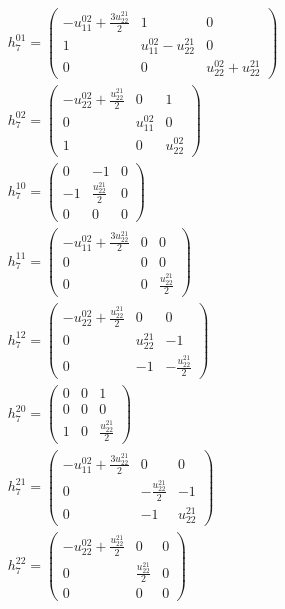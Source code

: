 \documentclass[a4paper, 11pt, twoside, onecolumn]{article}
\begin{document}
\begin{landscape}
\begin{gather*}
	 h_{7}^{01}=\begin{pmatrix}- u^{02}_{11} + \frac{3 u^{21}_{22}}{2} & 1 & 0\\1 & u^{02}_{11} - u^{21}_{22} & 0\\0 & 0 & u^{02}_{22} + u^{21}_{22}\end{pmatrix}\\ 
	 h_{7}^{02}=\begin{pmatrix}- u^{02}_{22} + \frac{u^{21}_{22}}{2} & 0 & 1\\0 & u^{02}_{11} & 0\\1 & 0 & u^{02}_{22}\end{pmatrix}\\ 
	 h_{7}^{10}=\begin{pmatrix}0 & -1 & 0\\-1 & \frac{u^{21}_{22}}{2} & 0\\0 & 0 & 0\end{pmatrix}\\ 
	 h_{7}^{11}=\begin{pmatrix}- u^{02}_{11} + \frac{3 u^{21}_{22}}{2} & 0 & 0\\0 & 0 & 0\\0 & 0 & \frac{u^{21}_{22}}{2}\end{pmatrix}\\ 
	 h_{7}^{12}=\begin{pmatrix}- u^{02}_{22} + \frac{u^{21}_{22}}{2} & 0 & 0\\0 & u^{21}_{22} & -1\\0 & -1 & - \frac{u^{21}_{22}}{2}\end{pmatrix}\\ 
	 h_{7}^{20}=\begin{pmatrix}0 & 0 & 1\\0 & 0 & 0\\1 & 0 & \frac{u^{21}_{22}}{2}\end{pmatrix}\\ 
	 h_{7}^{21}=\begin{pmatrix}- u^{02}_{11} + \frac{3 u^{21}_{22}}{2} & 0 & 0\\0 & - \frac{u^{21}_{22}}{2} & -1\\0 & -1 & u^{21}_{22}\end{pmatrix}\\ 
	 h_{7}^{22}=\begin{pmatrix}- u^{02}_{22} + \frac{u^{21}_{22}}{2} & 0 & 0\\0 & \frac{u^{21}_{22}}{2} & 0\\0 & 0 & 0\end{pmatrix}\\ 

\end{gather*}
\end{landscape}
\end{document}
